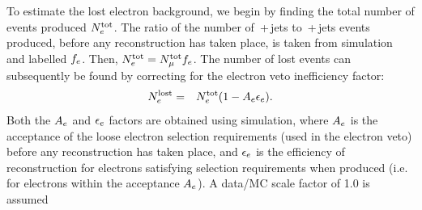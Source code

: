 To estimate the lost electron background, we begin by finding the total number of \wenu events produced $N^{\rm tot}_{e}$.
The ratio of the number of \wenubr\,+\,jets to \wmunubr{}\,+\,jets events produced, before any reconstruction has taken place, is taken from simulation and labelled $f_{e}$.  
Then, $N^{\rm tot}_{e} = N^{\rm tot}_{\mu}  f_{e}$. 
The number of lost \wenu events can subsequently be found by correcting for the electron veto inefficiency factor:
\begin{eqnarray}
N^{\rm lost}_{e} &=& N^{\rm tot}_{e}(1 - A_{e}\epsilon_{e}).
\end{eqnarray}
Both the $A_{e}$ and $\epsilon_{e}$ factors are obtained using simulation, where $A_{e}$ is the acceptance of the loose electron selection requirements (used in the electron veto) before any reconstruction has taken place, 
and $\epsilon_{e}$ is the efficiency of reconstruction for electrons satisfying selection requirements when produced (i.e. for electrons within the acceptance $A_{e}$).
A data/MC scale factor of 1.0 is assumed 

